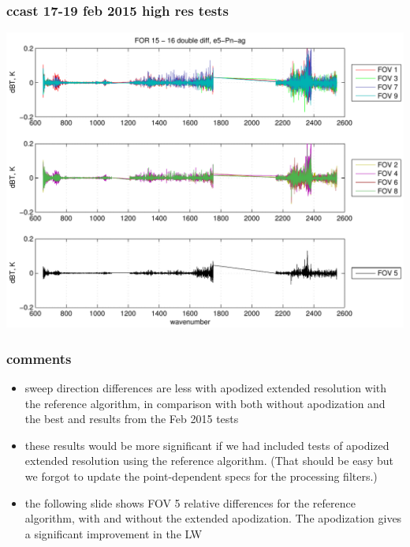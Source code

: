 \documentclass[11pt]{beamer}
\begin{document}
\begin{frame}
\frametitle{ccast 17-19 feb 2015 high res tests}
\begin{center}
  \includegraphics[scale=0.5]{figures/rel_ccast_ddif.pdf}
\end{center}
\end{frame}
\begin{frame}
\frametitle{comments}

\begin{itemize}

  \item sweep direction differences are less with apodized extended
    resolution with the {\ccast} reference algorithm, in comparison
    with both {\ccast} without apodization and the best {\noaa} and
    {\ccast} results from the Feb 2015 tests

  \item these results would be more significant if we had included
    tests of apodized extended resolution using the {\noaa} reference
    algorithm.  (That should be easy but we forgot to update the
    point-dependent specs for the {\noaa} processing filters.)

  \item the following slide shows FOV 5 relative differences for the
    {\ccast} reference algorithm, with and without the extended
    apodization.  The apodization gives a significant improvement in
    the LW 

\end{itemize}

\end{frame}
\end{document}
